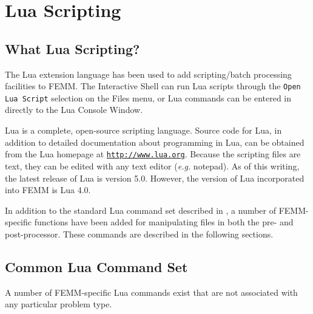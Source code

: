 ﻿%

\chapter{Lua Scripting}

\section{What Lua Scripting?}

The Lua extension language has been used to add scripting/batch
processing facilities to FEMM. The Interactive Shell can run Lua scripts
through the {\tt Open Lua Script} selection on the Files menu, or Lua commands can be
entered in directly to the Lua Console Window.

Lua is a complete, open-source scripting language.  Source code for
Lua, in addition to detailed documentation about programming in
Lua, can be obtained from the Lua homepage at
\href{http://www.lua.org}{\tt http://www.lua.org}. 
Because the
scripting files are text, they can be edited with any text editor
({\em e.g.} notepad). As of this writing, the latest release of Lua
is version 5.0. However, the version of Lua incorporated into FEMM
is Lua 4.0.

In addition to the standard Lua command set described in \cite{luaman}, a number of
FEMM-specific functions have been added for manipulating files in
both the pre- and post-processor.  These commands are described in
the following sections.

\section{Common Lua Command Set}

A number of FEMM-specific Lua commands exist that are not
associated with any particular problem type.

